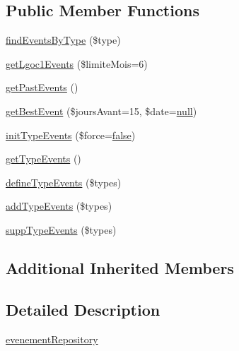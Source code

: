 \subsection*{Public Member Functions}
\begin{DoxyCompactItemize}
\item 
\hyperlink{class_acme_group_1_1_labo_bundle_1_1_entity_1_1evenement_repository_a2b7e098590ca322bf7ef580e8485b826}{find\+Events\+By\+Type} (\$type)
\item 
\hyperlink{class_acme_group_1_1_labo_bundle_1_1_entity_1_1evenement_repository_aa7833c420fe7bb28caaea9d59e669ff5}{get\+Lgoc1\+Events} (\$limite\+Mois=6)
\item 
\hyperlink{class_acme_group_1_1_labo_bundle_1_1_entity_1_1evenement_repository_a95c8c25b51fbe28aec81d5726c843afa}{get\+Past\+Events} ()
\item 
\hyperlink{class_acme_group_1_1_labo_bundle_1_1_entity_1_1evenement_repository_a12d5a7258ec5351c1925ab5c78c38622}{get\+Best\+Event} (\$jours\+Avant=15, \$date=\hyperlink{validate_8js_afb8e110345c45e74478894341ab6b28e}{null})
\item 
\hyperlink{class_acme_group_1_1_labo_bundle_1_1_entity_1_1evenement_repository_acb1cff2ddd7a11c43bebbd8009021159}{init\+Type\+Events} (\$force=\hyperlink{validate_8js_a5df37b7f02e5cdc7d9412b7f872b8e01}{false})
\item 
\hyperlink{class_acme_group_1_1_labo_bundle_1_1_entity_1_1evenement_repository_a084a276acab63d9fff7b18d996d4f1ba}{get\+Type\+Events} ()
\item 
\hyperlink{class_acme_group_1_1_labo_bundle_1_1_entity_1_1evenement_repository_a7f20c45f815db884f9deaaa1add5a8d4}{define\+Type\+Events} (\$types)
\item 
\hyperlink{class_acme_group_1_1_labo_bundle_1_1_entity_1_1evenement_repository_a89175911ff2a8d51e49839c0d5546c26}{add\+Type\+Events} (\$types)
\item 
\hyperlink{class_acme_group_1_1_labo_bundle_1_1_entity_1_1evenement_repository_a97332447e65ffb37f6e3ef019d364acc}{supp\+Type\+Events} (\$types)
\end{DoxyCompactItemize}
\subsection*{Additional Inherited Members}


\subsection{Detailed Description}
\hyperlink{class_acme_group_1_1_labo_bundle_1_1_entity_1_1evenement_repository}{evenement\+Repository}


